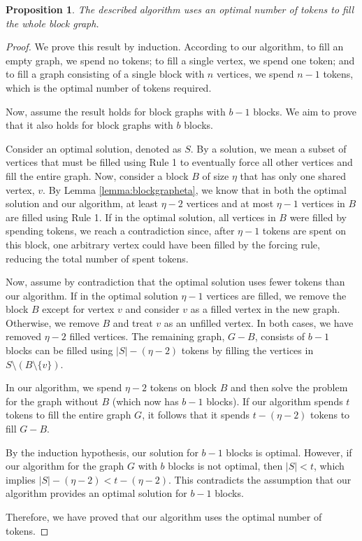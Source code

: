 \documentclass[11pt]{article}
\theoremstyle{plain}
\newtheorem{proposition}[theorem]{Proposition}
\theoremstyle{definition}
\theoremstyle{remark}
\begin{document}
\begin{proposition}
    The described algorithm uses an optimal number of tokens to fill the whole block graph.
\end{proposition}

\begin{proof}
    We prove this result by induction. According to our algorithm, to fill an empty graph, we spend no tokens; to fill a single vertex, we spend one token; and to fill a graph consisting of a single block with $n$ vertices, we spend $n - 1$ tokens, which is the optimal number of tokens required.

    Now, assume the result holds for block graphs with $b-1$ blocks. We aim to prove that it also holds for block graphs with $b$ blocks.

    Consider an optimal solution, denoted as $S$. By a solution, we mean a subset of vertices that must be filled using Rule 1 to eventually force all other vertices and fill the entire graph. Now, consider a block $B$ of size $\eta$ that has only one shared vertex, $v$. By Lemma \ref{lemma:blockgrapheta}, we know that in both the optimal solution and our algorithm, at least $\eta - 2$ vertices and at most $\eta - 1$ vertices in $B$ are filled using Rule 1. If in the optimal solution, all vertices in $B$ were filled by spending tokens, we reach a contradiction since, after $\eta - 1$ tokens are spent on this block, one arbitrary vertex could have been filled by the forcing rule, reducing the total number of spent tokens.

    Now, assume by contradiction that the optimal solution uses fewer tokens than our algorithm. If in the optimal solution $\eta - 1$ vertices are filled, we remove the block $B$ except for vertex $v$ and consider $v$ as a filled vertex in the new graph. Otherwise, we remove $B$ and treat $v$ as an unfilled vertex. In both cases, we have removed $\eta - 2$ filled vertices. The remaining graph, $G - B$, consists of $b-1$ blocks can be filled using $|S| - (\eta - 2)$ tokens by filling the vertices in $S \setminus (B \setminus \{v\}) $.

    In our algorithm, we spend $\eta - 2$ tokens on block $B$ and then solve the problem for the graph without $B$ (which now has $b-1$ blocks). If our algorithm spends $t$ tokens to fill the entire graph $G$, it follows that it spends $t - (\eta - 2)$ tokens to fill $G - B$.

    By the induction hypothesis, our solution for $b-1$ blocks is optimal. However, if our algorithm for the graph $G$ with $b$ blocks is not optimal, then $|S| < t$, which implies $|S| - (\eta - 2) < t - (\eta - 2)$. This contradicts the assumption that our algorithm provides an optimal solution for $b-1$ blocks.

Therefore, we have proved that our algorithm uses the optimal number of tokens.
\end{proof} 
\end{document}
